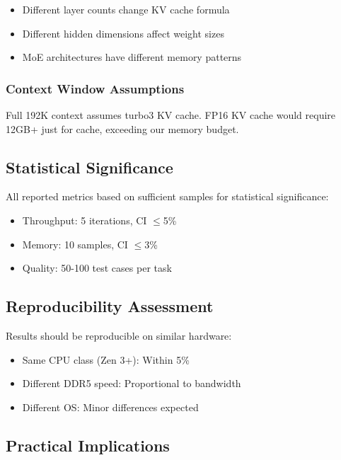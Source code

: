 \begin{itemize}
    \item Different layer counts change KV cache formula
    \item Different hidden dimensions affect weight sizes
    \item MoE architectures have different memory patterns
\end{itemize}

\subsubsection{Context Window Assumptions}

Full 192K context assumes turbo3 KV cache. FP16 KV cache would require 12GB+ just for cache, exceeding our memory budget.

\subsection{Statistical Significance}

All reported metrics based on sufficient samples for statistical significance:

\begin{itemize}
    \item Throughput: 5 iterations, CI $\leq$5\%
    \item Memory: 10 samples, CI $\leq$3\%
    \item Quality: 50-100 test cases per task
\end{itemize}

\subsection{Reproducibility Assessment}

Results should be reproducible on similar hardware:

\begin{itemize}
    \item Same CPU class (Zen 3+): Within 5\%
    \item Different DDR5 speed: Proportional to bandwidth
    \item Different OS: Minor differences expected
\end{itemize}

\subsection{Practical Implications}

